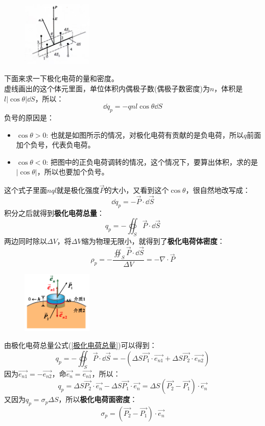 \documentclass[cn,hazy,blue,14pt,normal]{elegantnote}
\numberwithin{equation}{section}
\begin{document}
\begin{figure}
	\includegraphics[width=0.3\textwidth]{image/极化电荷.jpg}
\end{figure}
下面来求一下极化电荷的量和密度。\\
虚线画出的这个体元里面，单位体积内偶极子数(偶极子数密度)为$n$，体积是$l\left |\cos \theta\right |\dd S$，所以：
$$ \dd q_p = -qnl\cos \theta \dd S $$
负号的原因是：
\begin{itemize}
	\item $\cos \theta > 0 $: 也就是如图所示的情况，对极化电荷有贡献的是负电荷，所以$q$前面加个负号，代表负电荷。
	\item $\cos \theta < 0 $: 把图中的正负电荷调转的情况，这个情况下，要算出体积，求的是$\left | \cos \theta \right |$，所以也要加个负号。
\end{itemize}
这个式子里面$nql$就是极化强度$\vec{P}$的大小，又看到这个$\cos \theta$，很自然地改写成：
$$ \dd q_p = -\vec{P}\cdot \dd \vec{S}$$
积分之后就得到\textbf{极化电荷总量}：
\begin{equation}\label{极化电荷总量}
	q_p = -\oiint_S \vec{P}\cdot \dd \vec{S}
\end{equation}
两边同时除以$\Delta V$，将$\Delta V$缩为物理无限小，就得到了\textbf{极化电荷体密度}：
\begin{equation}\label{极化电荷体密度}
	\rho_p = -\frac{\oiint_S \vec{P}\cdot \dd \vec{S}}{\Delta V} = -\nabla \cdot \vec{P}
\end{equation}
\begin{figure}
	\includegraphics[width=0.3\textwidth]{image/极化电荷面密度.png}
\end{figure}
由极化电荷总量公式(\ref{极化电荷总量})可以得到：
$$
q_p = -\oiint_S \vec{P}\cdot \dd \vec{S} = -(\Delta S \vec{P_1}\cdot \vec{e_{n1}} + \Delta S \vec{P_2}\cdot \vec{e_{n2}})
$$
因为$\vec{e_{n1}} = -\vec{e_{n2}}$，命$\vec{e_n} = \vec{e_{n1}}$，所以：
$$
q_p = \Delta S \vec{P_2}\cdot \vec{e_{n}} - \Delta S \vec{P_1}\cdot \vec{e_{n}} = \Delta S (\vec{P_2}-\vec{P_1})\cdot \vec{e_{n}}
$$
又因为$q_p = \sigma_p \Delta S $，所以\textbf{极化电荷面密度}： 
\begin{equation}\label{极化电荷面密度}
	\sigma_p = (\vec{P_2}-\vec{P_1})\cdot \vec{e_{n}}
\end{equation}
\end{document}
